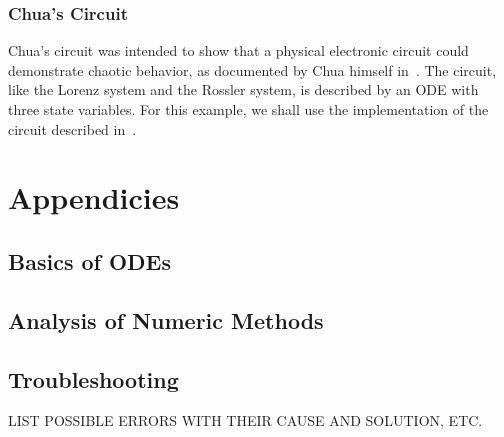 \documentclass[letterpaper,10pt]{book}
\begin{document}
    \section{Chua's Circuit}
      Chua's circuit was intended to show that a physical electronic circuit could demonstrate chaotic behavior, as documented by Chua himself in~\cite{chua1992genesis}.  The circuit, like the Lorenz system and the Rossler system, is described by an ODE with three state variables.  For this example, we shall use the implementation of the circuit described in~\cite{kennedy1992robust}.


\part{Appendicies}
  \chapter{Basics of ODEs}
  
  \chapter{Analysis of Numeric Methods}
  
  \chapter{Troubleshooting}
    LIST POSSIBLE ERRORS WITH THEIR CAUSE AND SOLUTION, ETC.
    


  
\printindex
\end{document}
